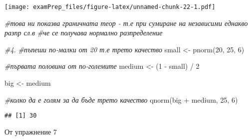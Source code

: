 \documentclass[
]{article}
\newenvironment{Shaded}{\begin{snugshade}}{\end{snugshade}}
\newcommand{\CommentTok}[1]{\textcolor[rgb]{0.56,0.35,0.01}{\textit{#1}}}
\newcommand{\DecValTok}[1]{\textcolor[rgb]{0.00,0.00,0.81}{#1}}
\newcommand{\FunctionTok}[1]{\textcolor[rgb]{0.00,0.00,0.00}{#1}}
\newcommand{\NormalTok}[1]{#1}
\newcommand{\OtherTok}[1]{\textcolor[rgb]{0.56,0.35,0.01}{#1}}
\newcommand{\SpecialCharTok}[1]{\textcolor[rgb]{0.00,0.00,0.00}{#1}}
\begin{document}
\texttt{[image: examPrep\_files/figure-latex/unnamed-chunk-22-1.pdf]}

\begin{Shaded}
\begin{Highlighting}[]
\CommentTok{\#това ни показва граничната теор {-} т.е при сумиране на независими еднакво разпр сл.в}
\CommentTok{\#че се получава нормално разпределение}
\end{Highlighting}
\end{Shaded}

\begin{Shaded}
\begin{Highlighting}[]
\CommentTok{\#4. }
\CommentTok{\#пъпеши по{-}малки от 20 т.е трето качество}
\NormalTok{small }\OtherTok{\textless{}{-}} \FunctionTok{pnorm}\NormalTok{(}\DecValTok{20}\NormalTok{, }\DecValTok{25}\NormalTok{, }\DecValTok{6}\NormalTok{)}

\CommentTok{\#първата половина от по{-}големите}
\NormalTok{medium }\OtherTok{\textless{}{-}}\NormalTok{ (}\DecValTok{1} \SpecialCharTok{{-}}\NormalTok{ small) }\SpecialCharTok{/} \DecValTok{2}

\NormalTok{big }\OtherTok{\textless{}{-}}\NormalTok{ medium}

\CommentTok{\#колко да е голям за да бъде трето качество }
\FunctionTok{qnorm}\NormalTok{(big }\SpecialCharTok{+}\NormalTok{ medium, }\DecValTok{25}\NormalTok{, }\DecValTok{6}\NormalTok{)}
\end{Highlighting}
\end{Shaded}

\begin{verbatim}
## [1] 30
\end{verbatim}

От упражнение 7
\end{document}
